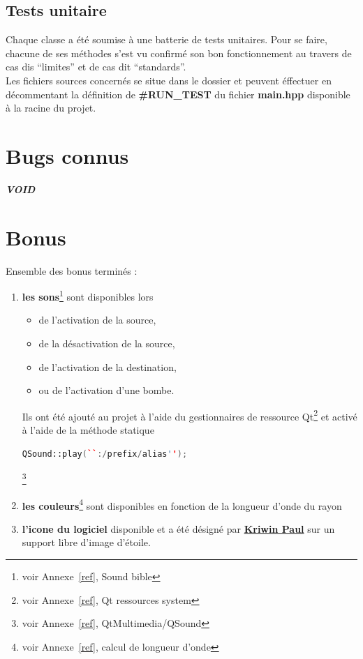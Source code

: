 \documentclass[a4paper,11pt]{report}
\begin{document}
\section{Tests unitaire}
Chaque classe a été soumise à une batterie de tests unitaires. Pour se faire,
chacune de ses méthodes s'est vu confirmé son bon fonctionnement au travers de
cas dis ``limites'' et de cas dit ``standards''. \\

Les fichiers sources concernés se situe dans le dossier  et peuvent
éffectuer en décommentant la définition de \textbf{\#RUN\_TEST} du fichier
\textbf{main.hpp} disponible à la racine du projet.
\chapter{Bugs connus}
\begin{center}
	\textbf{\textit{VOID}}
\end{center}
\newpage
\chapter{Bonus}

Ensemble des bonus terminés :
\begin{enumerate}
	\item \textbf{les sons}\footnote{voir Annexe~\ref{ref}, Sound bible}  sont disponibles lors 
		\begin{itemize}
			\item de l'activation de la source,
			\item de la désactivation de la source,
			\item de l'activation de la destination,
			\item ou de l'activation d'une bombe.
		\end{itemize}
		Ils ont été ajouté au projet à l'aide du gestionnaires de ressource
		Qt\footnote{voir Annexe~\ref{ref}, Qt ressources system} 
		et activé à l'aide de la méthode statique 
		\begin{lstlisting}[language=C++]
		QSound::play(``:/prefix/alias'');
		\end{lstlisting}\footnote{voir Annexe~\ref{ref}, QtMultimedia/QSound}
	\item \textbf{les couleurs}\footnote{voir Annexe~\ref{ref}, calcul de longueur d'onde} 
		sont disponibles en fonction de la longueur d'onde du rayon
	\item \textbf{l'icone du logiciel} disponible et a été désigné par
		\href{mailto:39171@heb.be}{\textbf{Kriwin Paul}} sur un support libre d'image d'étoile.
\end{enumerate}
\end{document}
